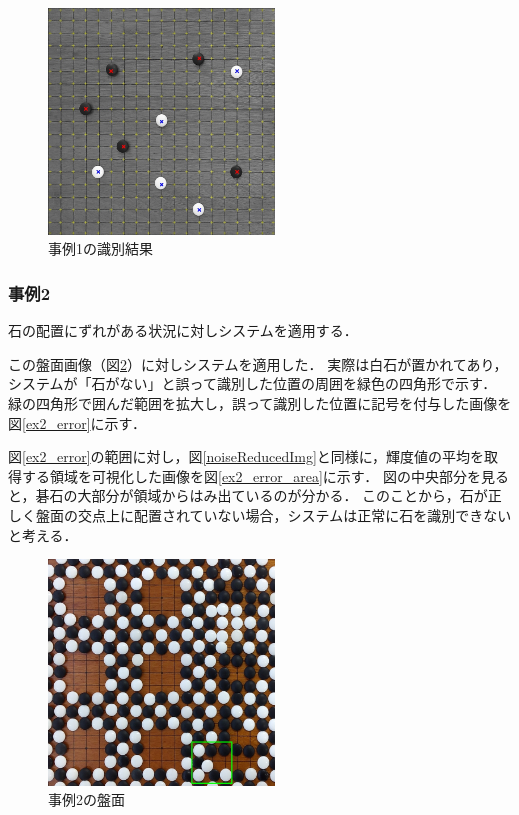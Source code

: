 \documentclass[openright]{nitocs}
\numberwithin{equation}{section}
\begin{document}
                \begin{figure}[tb] %
                    \begin{center}
                    \includegraphics[clip,width=60mm]{DSC_0041/result.jpg} 
                    \caption{事例1の識別結果}
                    \label{ex1_result}
                    \end{center}
                \end{figure}

            \subsubsection{事例2} %
                石の配置にずれがある状況に対しシステムを適用する．

                この盤面画像（図\ref{ex2_img}）に対しシステムを適用した．
                実際は白石が置かれてあり，システムが「石がない」と誤って識別した位置の周囲を緑色の四角形で示す．
                緑の四角形で囲んだ範囲を拡大し，誤って識別した位置に記号を付与した画像を図\ref{ex2_error}に示す．

                図\ref{ex2_error}の範囲に対し，図\ref{noiseReducedImg}と同様に，輝度値の平均を取得する領域を可視化した画像を図\ref{ex2_error_area}に示す．
                図の中央部分を見ると，碁石の大部分が領域からはみ出ているのが分かる．
                このことから，石が正しく盤面の交点上に配置されていない場合，システムは正常に石を識別できないと考える．
                
                
                \begin{figure}[tb] %
                    \begin{center}
                    \includegraphics[clip,width=60mm]{DSC_0099/boardImg.jpg} 
                    \caption{事例2の盤面}
                    \label{ex2_img}
                    \end{center}
                \end{figure}
\end{document}

